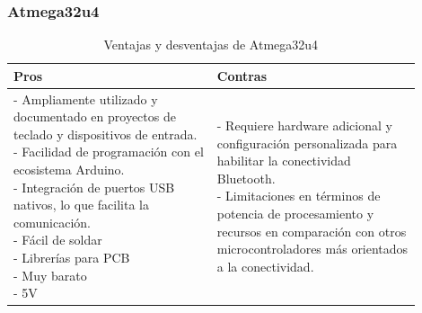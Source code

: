 \subsubsection{Atmega32u4}
\begin{table}[H]
\centering
\small
\begin{tabular}{|p{0.45\linewidth}|p{0.45\linewidth}|}
\hline
\textbf{Pros} &
\textbf{Contras} \\
\hline
\parbox[t]{\linewidth}{
\vspace{0.1cm}
- Ampliamente utilizado y documentado en proyectos de teclado y dispositivos de entrada. \medskip \\
- Facilidad de programación con el ecosistema \gls{Arduino}. \medskip \\
- Integración de puertos \gls{USB} nativos, lo que facilita la comunicación. \medskip \\
- Fácil de soldar \medskip \\
- Librerías para \gls{PCB} \medskip \\
- Muy barato \medskip \\
- 5V \\
\vspace{0.1cm}
} &
\parbox[t]{\linewidth}{
\vspace{0.1cm}
- Requiere hardware adicional y configuración personalizada para habilitar la conectividad \gls{Bluetooth}. \medskip \\
- Limitaciones en términos de potencia de procesamiento y recursos en comparación con otros microcontroladores más orientados a la conectividad.} \medskip \\
\hline
\end{tabular}
\caption{Ventajas y desventajas de Atmega32u4}
\end{table}

